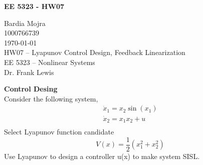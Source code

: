 \documentclass{homeworg}
\begin{document}

\begin{center}
\textbf{EE 5323 - HW07}\\
\end{center}

\noindent
Bardia Mojra\\
1000766739\\
\today\\
HW07 -- Lyapunov Control Design, Feedback Linearization\\
EE 5323 -- Nonlinear Systems\\
Dr. Frank Lewis

\exercise
\noindent
\textbf{Control Desing}\\
Consider the following system,
\begin{equation*}
  \begin{array}{lcl}
    \dot{x}_1 = x_2 \sin(x_1)\\
    \dot{x}_2 = x_1 x_2 + u \\
  \end{array}
\end{equation*}
Select Lyapunov function candidate
\begin{equation*}
V(x) = \frac{1}{2} (x_1^2  + x_2^2)
\end{equation*}
Use Lyapunov to design a controller u(x) to make system SISL.
\end{document}
